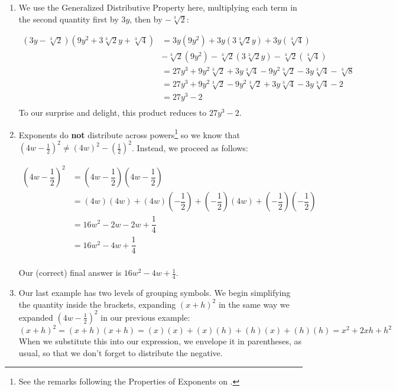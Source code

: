 \begin{ex}
\begin{enumerate}
\item  We use the Generalized Distributive Property here, multiplying each term in the second quantity first by $3y$, then by $-\sqrt[3]{2}$:

\begin{align*}
\left(3y - \sqrt[3]{2}\right)\left(9y^2 + 3\sqrt[3]{2} y + \sqrt[3]{4}\right) & = 3y\left(9y^2\right) +3y\left(3\sqrt[3]{2} y\right) + 3y\left(\sqrt[3]{4}\right) \\
& -\sqrt[3]{2} \left(9y^2\right) - \sqrt[3]{2} \left(3\sqrt[3]{2} y\right) -\sqrt[3]{2} \left(\sqrt[3]{4}\right) \\
& = 27y^3 + 9y^2 \sqrt[3]{2} + 3y \sqrt[3]{4} - 9y^2\sqrt[3]{2} - 3y \sqrt[3]{4} - \sqrt[3]{8} \\
& = 27y^3 + 9y^2 \sqrt[3]{2} - 9y^2 \sqrt[3]{2} + 3y \sqrt[3]{4} - 3y \sqrt[3]{4} - 2 \\
& = 27y^3 - 2 \\ 
\end{align*}
To our surprise and delight, this product reduces to $27y^3 - 2$.

\item Exponents do \textbf{not} distribute across powers\footnote{See the remarks following the Properties of Exponents on \pageref{box:propertiesofintegerexponents}.} so we know that  $\left(4w - \frac{1}{2} \right)^2 \neq (4w)^2 - \left(\frac{1}{2}\right)^2$.  Instead, we proceed as follows:

\begin{align*}
\left(4w - \dfrac{1}{2} \right)^2 & = \left(4w - \dfrac{1}{2} \right)\left(4w - \dfrac{1}{2} \right) \\
& = (4w)(4w) + (4w)\left(-\dfrac{1}{2}\right) + \left(-\dfrac{1}{2}\right)(4w) + \left(-\dfrac{1}{2}\right)\left(-\dfrac{1}{2}\right) \tag{F.O.I.L.} \\
& = 16w^2 - 2w - 2w + \dfrac{1}{4} \tag{Multiply} \\ 
& = 16w^2 - 4w + \dfrac{1}{4} \tag{Combine like terms} \\ 
\end{align*} 

Our (correct) final answer is $16w^2 - 4w + \frac{1}{4}$.

\item  Our last example has two levels of grouping symbols.  We begin simplifying the quantity inside the brackets, expanding $(x+h)^2$ in the same way we expanded $(4w - \frac{1}{2})^{2}$ in our previous example: \[ (x+h)^2 = (x+h)(x+h) = (x)(x) + (x)(h) + (h)(x) + (h)(h) = x^2 + 2xh + h^2 \]  When we substitute this into our expression, we envelope it in parentheses, as usual, so that we don't forget to distribute the negative.


\end{enumerate}
\end{ex}

